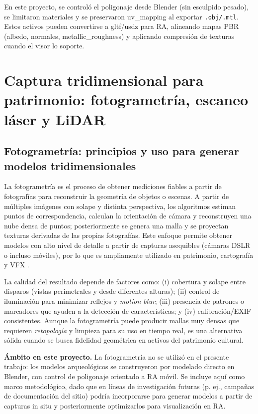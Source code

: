 En este proyecto, se controló el \gls{poligonaje} desde Blender (sin esculpido pesado), se limitaron materiales y se preservaron \gls{uv_mapping} al exportar \texttt{.obj/.mtl}. Estos activos pueden convertirse a \gls{gltf}/\gls{usdz} para RA, alineando mapas \gls{PBR} (albedo, \gls{normales}, \gls{metallic_roughness}) y aplicando compresión de texturas cuando el visor lo soporte.





\section*{Captura tridimensional para patrimonio: fotogrametría, escaneo láser y LiDAR}
\subsection*{Fotogrametría: principios y uso para generar modelos tridimensionales}

La fotogrametría es el proceso de obtener mediciones fiables a partir de fotografías para reconstruir la geometría de objetos o escenas. A partir de múltiples imágenes con solape y distinta perspectiva, los algoritmos estiman puntos de correspondencia, calculan la orientación de cámara y reconstruyen una nube densa de puntos; posteriormente se genera una malla y se proyectan texturas derivadas de las propias fotografías. Este enfoque permite obtener modelos con alto nivel de detalle a partir de capturas asequibles (cámaras DSLR o incluso móviles), por lo que es ampliamente utilizado en patrimonio, cartografía y VFX \cite{ArtecPhotogrammetry2025}.

La calidad del resultado depende de factores como: (i) cobertura y solape entre disparos (vistas perimetrales y desde diferentes alturas); (ii) control de iluminación para minimizar reflejos y \textit{motion blur}; (iii) presencia de patrones o marcadores que ayuden a la detección de características; y (iv) calibración/EXIF consistentes. Aunque la fotogrametría puede producir mallas muy densas que requieren \textit{retopología} y limpieza para su uso en tiempo real, es una alternativa sólida cuando se busca fidelidad geométrica en activos del patrimonio cultural.


\textbf{Ámbito en este proyecto.} La fotogrametría no se utilizó en el presente trabajo: los modelos arqueológicos se construyeron por modelado directo en Blender, con control de poligonaje orientado a RA móvil. Se incluye aquí como marco metodológico, dado que en líneas de investigación futuras (p. ej., campañas de documentación del sitio) podría incorporarse para generar modelos a partir de capturas in situ y posteriormente optimizarlos para visualización en RA.

